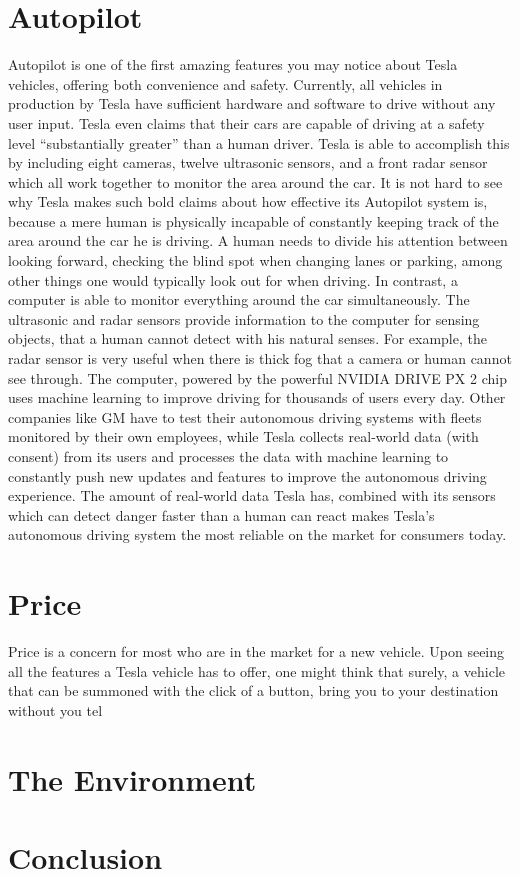 \documentclass{article}
\begin{document}
  \section{Autopilot}
  Autopilot is one of the first amazing features you may notice about Tesla vehicles, offering both convenience and safety.
  Currently, all vehicles in production by Tesla have sufficient hardware and software to
  drive without any user input. Tesla even claims that their cars are capable of driving
  at a safety level ``substantially greater'' than a human driver\cite{allcarsautopilot}.
  Tesla is able to accomplish this by including eight cameras, twelve ultrasonic sensors, and a front radar
  sensor which all work together to monitor the area around the car. It is not hard
  to see why Tesla makes such bold claims about how effective its Autopilot system is,
  because a mere human is physically incapable of constantly keeping track of the area around
  the car he is driving. A human needs to divide his attention between looking forward,
  checking the blind spot when changing lanes or parking, among other things one would typically
  look out for when driving. In contrast, a computer is able to monitor everything
  around the car simultaneously. The ultrasonic and radar sensors
  provide information to the computer for sensing objects, that a human cannot
  detect with his natural senses. For example, the radar sensor is very useful when
  there is thick fog that a camera or human cannot see through. The computer, powered
  by the powerful NVIDIA DRIVE PX 2 chip uses machine learning to improve driving for
  thousands of users every day. Other companies like GM have to test their autonomous
  driving systems with fleets monitored by their own employees, while Tesla collects
  real-world data (with consent) from its users and processes the data with machine
  learning to constantly push new updates and features to improve the autonomous
  driving experience.
  \cite{tdata1}\cite{tdata2}\cite{tdata3}
  The amount of real-world data Tesla has, combined with its sensors which can
  detect danger faster than a human can react\cite{predictcrash} makes Tesla's
  autonomous driving system the most reliable on the market for consumers today.

  \section{Price}
  Price is a concern for most who are in the market for a new vehicle. Upon seeing
  all the features a Tesla vehicle has to offer, one might think that surely,
  a vehicle that can be summoned with the click of a button, bring you to your
  destination without you tel

  \section{The Environment}
  \blindtext{}\blindtext{}

  \section{Conclusion}
  \blindtext{}\blindtext{}


\end{document}
